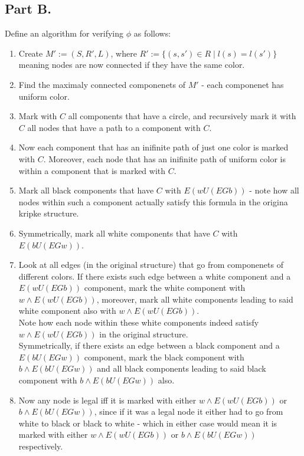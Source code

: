 \documentclass{article}
\begin{document}
\subsection*{Part B.}
Define an algorithm for verifying $\phi$ as follows:
\begin{enumerate}
    \item Create $M':=(S,R',L)$, where $R':=\{(s,s')\in R\mid l(s)=l(s')\}$
        meaning nodes are now connected if they have the same color.
    \item Find the maximaly connected componenets of $M'$ - each componenet has uniform color.
    \item Mark with $C$ all components that have a circle, and recursively mark
    it with $C$ all nodes that have a path to a component with $C$.
    \item Now each component that has an inifinite path of just one color is marked
    with $C$. Moreover, each node that has an inifinite path of uniform color is within
    a component that is marked with $C$.
    \item Mark all black components that have $C$ with $E(wU(EGb))$ - note how
    all nodes within such a component actually satisfy this formula in the origina kripke structure.\\
    \item Symmetrically, mark all white components that have $C$ with $E(bU(EGw))$.
    \item Look at all edges (in the original structure) that go from 
    componenets of different colors. If there exists such edge between a
    white component and a $E(wU(EGb))$ component, mark the white component with $w\wedge E(wU(EGb))$,
    moreover, mark all white components leading to said white component also with $w\wedge E(wU(EGb))$.\\
    Note how each node within these white components indeed satisfy $w\wedge E(wU(EGb))$ in the
    original structure.\\
    Symmetrically, if there exists an edge between a black component and a $E(bU(EGw))$ component,
    mark the black component with $b\wedge E(bU(EGw))$ and all black components leading to said
    black component with $b\wedge E(bU(EGw))$ also.\\
    \item Now any node is legal iff it is marked with either $w\wedge E(wU(EGb))$ or $b\wedge E(bU(EGw))$,
    since if it was a legal node it either had to go from white to black or black to white - 
    which in either case would mean it is marked with either $w\wedge E(wU(EGb))$ or $b\wedge E(bU(EGw))$ respectively.
\end{enumerate}
\end{document}
